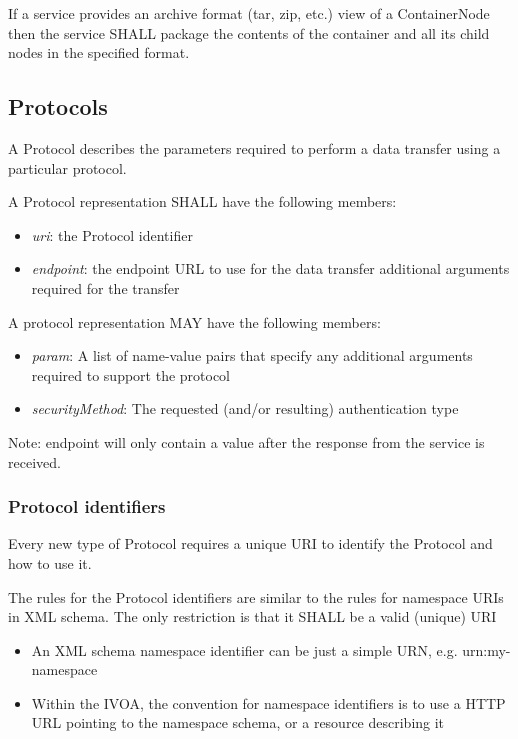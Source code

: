 \documentclass[11pt,a4paper]{ivoa}
\begin{document}
If a service provides an archive format (tar, zip, etc.) view of a ContainerNode then the service SHALL package the contents of the container and all its child nodes in the specified format.

\subsection{Protocols}
\label{subsec:protocols}
A Protocol describes the parameters required to perform a data transfer using a particular protocol.

A Protocol representation SHALL have the following members:

\begin{itemize}
    \item \emph{uri}: the Protocol identifier
    \item \emph{endpoint}: the endpoint URL to use for the data transfer additional arguments required for the transfer
\end{itemize}

A protocol representation MAY have the following members:

\begin{itemize}
    \item \emph{param}: A list of name-value pairs that specify any additional arguments required to support the protocol
    \item \emph{securityMethod}: The requested (and/or resulting) authentication type
\end{itemize}

Note: endpoint will only contain a value after the response from the service is received.

\subsubsection{Protocol identifiers}
\label{subsubsec:protocol identifiers}
Every new type of Protocol requires a unique URI to identify the Protocol and how to use it.

The rules for the Protocol identifiers are similar to the rules for namespace URIs in XML schema. The only restriction is that it SHALL be a valid (unique) URI

\begin{itemize}
    \item An XML schema namespace identifier can be just a simple URN, e.g. urn:my-namespace
    \item Within the IVOA, the convention for namespace identifiers is to use a HTTP URL pointing to the namespace schema, or a resource describing it
\end{itemize}
\end{document}
